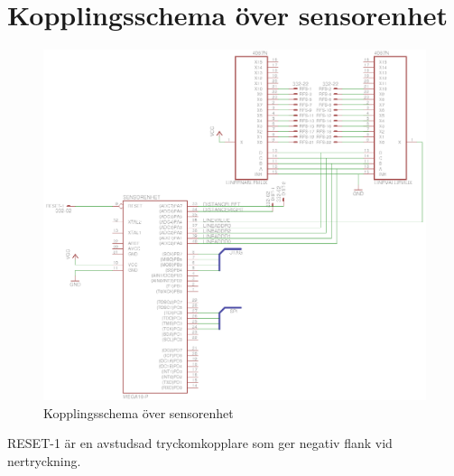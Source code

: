 \section{Kopplingsschema över sensorenhet}

\begin{figure}[h]
\center
\includegraphics{sensorenhet}
\caption{Kopplingsschema över sensorenhet}
\end{figure}

RESET-1 är en avstudsad tryckomkopplare som ger negativ flank vid nertryckning.
